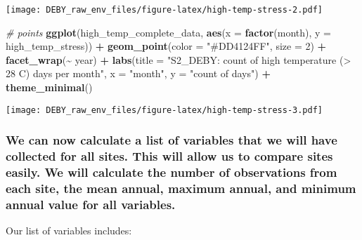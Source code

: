 \documentclass[
]{article}
\newenvironment{Shaded}{\begin{snugshade}}{\end{snugshade}}
\newcommand{\AttributeTok}[1]{\textcolor[rgb]{0.13,0.29,0.53}{#1}}
\newcommand{\CommentTok}[1]{\textcolor[rgb]{0.56,0.35,0.01}{\textit{#1}}}
\newcommand{\DecValTok}[1]{\textcolor[rgb]{0.00,0.00,0.81}{#1}}
\newcommand{\FunctionTok}[1]{\textcolor[rgb]{0.13,0.29,0.53}{\textbf{#1}}}
\newcommand{\NormalTok}[1]{#1}
\newcommand{\SpecialCharTok}[1]{\textcolor[rgb]{0.81,0.36,0.00}{\textbf{#1}}}
\newcommand{\StringTok}[1]{\textcolor[rgb]{0.31,0.60,0.02}{#1}}
\begin{document}
\texttt{[image: DEBY\_raw\_env\_files/figure-latex/high-temp-stress-2.pdf]}

\begin{Shaded}
\begin{Highlighting}[]
\CommentTok{\# points}
\FunctionTok{ggplot}\NormalTok{(high\_temp\_complete\_data, }\FunctionTok{aes}\NormalTok{(}\AttributeTok{x =} \FunctionTok{factor}\NormalTok{(month), }\AttributeTok{y =}\NormalTok{ high\_temp\_stress)) }\SpecialCharTok{+}
  \FunctionTok{geom\_point}\NormalTok{(}\AttributeTok{color =} \StringTok{"\#DD4124FF"}\NormalTok{, }\AttributeTok{size =} \DecValTok{2}\NormalTok{) }\SpecialCharTok{+} 
  \FunctionTok{facet\_wrap}\NormalTok{(}\SpecialCharTok{\textasciitilde{}}\NormalTok{ year) }\SpecialCharTok{+}  
  \FunctionTok{labs}\NormalTok{(}\AttributeTok{title =} \StringTok{"S2\_DEBY: count of high temperature (\textgreater{} 28 C) days per month"}\NormalTok{,}
       \AttributeTok{x =} \StringTok{"month"}\NormalTok{,}
       \AttributeTok{y =} \StringTok{"count of days"}\NormalTok{) }\SpecialCharTok{+}
  \FunctionTok{theme\_minimal}\NormalTok{()}
\end{Highlighting}
\end{Shaded}

\texttt{[image: DEBY\_raw\_env\_files/figure-latex/high-temp-stress-3.pdf]}

\hypertarget{we-can-now-calculate-a-list-of-variables-that-we-will-have-collected-for-all-sites.-this-will-allow-us-to-compare-sites-easily.-we-will-calculate-the-number-of-observations-from-each-site-the-mean-annual-maximum-annual-and-minimum-annual-value-for-all-variables.}{%
\subsubsection{We can now calculate a list of variables that we will
have collected for all sites. This will allow us to compare sites
easily. We will calculate the number of observations from each site, the
mean annual, maximum annual, and minimum annual value for all
variables.}\label{we-can-now-calculate-a-list-of-variables-that-we-will-have-collected-for-all-sites.-this-will-allow-us-to-compare-sites-easily.-we-will-calculate-the-number-of-observations-from-each-site-the-mean-annual-maximum-annual-and-minimum-annual-value-for-all-variables.}}

Our list of variables includes:
\end{document}
